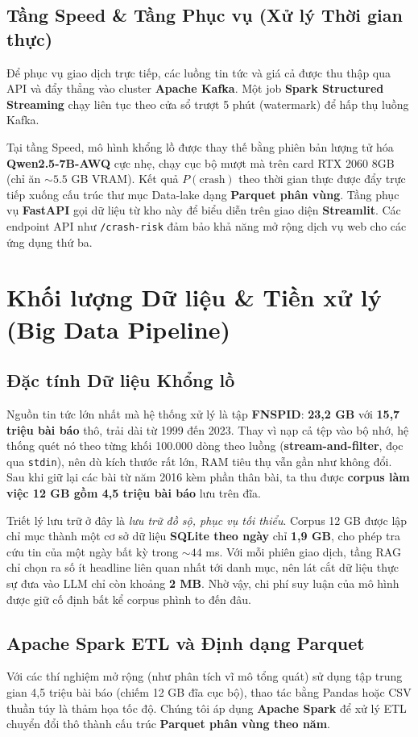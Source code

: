 \documentclass[11pt, a4paper]{article}
\begin{document}
\subsection{Tầng Speed \& Tầng Phục vụ (Xử lý Thời gian thực)}
Để phục vụ giao dịch trực tiếp, các luồng tin tức và giá cả được thu thập qua API và đẩy thẳng vào cluster \textbf{Apache Kafka}. Một job \textbf{Spark Structured Streaming} chạy liên tục theo cửa sổ trượt 5 phút (watermark) để hấp thụ luồng Kafka. 

Tại tầng Speed, mô hình khổng lồ được thay thế bằng phiên bản lượng tử hóa \textbf{Qwen2.5-7B-AWQ} cực nhẹ, chạy cục bộ mượt mà trên card RTX 2060 8GB (chỉ ăn $\sim 5.5$ GB VRAM). Kết quả $P(\text{crash})$ theo thời gian thực được đẩy trực tiếp xuống cấu trúc thư mục Data-lake dạng \textbf{Parquet phân vùng}. Tầng phục vụ \textbf{FastAPI} gọi dữ liệu từ kho này để biểu diễn trên giao diện \textbf{Streamlit}. Các endpoint API như \texttt{/crash-risk} đảm bảo khả năng mở rộng dịch vụ web cho các ứng dụng thứ ba.

\section{Khối lượng Dữ liệu \& Tiền xử lý (Big Data Pipeline)}

\subsection{Đặc tính Dữ liệu Khổng lồ}
Nguồn tin tức lớn nhất mà hệ thống xử lý là tập \textbf{FNSPID}: \textbf{23,2 GB} với \textbf{15,7 triệu bài báo} thô, trải dài từ 1999 đến 2023. Thay vì nạp cả tệp vào bộ nhớ, hệ thống quét nó theo từng khối 100.000 dòng theo luồng (\textbf{stream-and-filter}, đọc qua \texttt{stdin}), nên dù kích thước rất lớn, RAM tiêu thụ vẫn gần như không đổi. Sau khi giữ lại các bài từ năm 2016 kèm phần thân bài, ta thu được \textbf{corpus làm việc 12 GB gồm 4,5 triệu bài báo} lưu trên đĩa.

Triết lý lưu trữ ở đây là \textit{lưu trữ đồ sộ, phục vụ tối thiểu}. Corpus 12 GB được lập chỉ mục thành một cơ sở dữ liệu \textbf{SQLite theo ngày} chỉ \textbf{1,9 GB}, cho phép tra cứu tin của một ngày bất kỳ trong $\sim 44$ ms. Với mỗi phiên giao dịch, tầng RAG chỉ chọn ra số ít headline liên quan nhất tới danh mục, nên lát cắt dữ liệu thực sự đưa vào LLM chỉ còn khoảng \textbf{2 MB}. Nhờ vậy, chi phí suy luận của mô hình được giữ cố định bất kể corpus phình to đến đâu.

\subsection{Apache Spark ETL và Định dạng Parquet}
Với các thí nghiệm mở rộng (như phân tích vĩ mô tổng quát) sử dụng tập trung gian 4,5 triệu bài báo (chiếm 12 GB đĩa cục bộ), thao tác bằng Pandas hoặc CSV thuần túy là thảm họa tốc độ. Chúng tôi áp dụng \textbf{Apache Spark} để xử lý ETL chuyển đổi thô thành cấu trúc \textbf{Parquet phân vùng theo năm}. 
\end{document}
